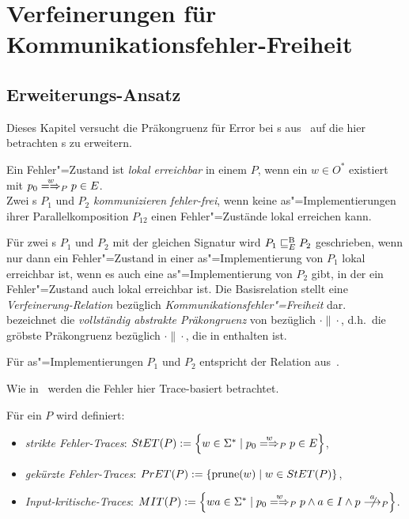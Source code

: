 \chapter{Verfeinerungen für Kommunikationsfehler-Freiheit}

\section{Erweiterungs-Ansatz}

Dieses Kapitel versucht die Präkongruenz für Error bei \EIO{}s
aus~\cite{Schinko2016BA} auf die hier betrachten \MEIO{}s zu erweitern.

\begin{Def}
  Ein Fehler"=Zustand ist \emph{lokal erreichbar} in einem \MEIO{} $P$, wenn
  ein $w\in O^*$ existiert mit $p_0 \weakmay[w]_{P} p\in E$.\\
  Zwei \MEIO{}s $P_1$ und $P_2$ \emph{kommunizieren fehler-frei}, wenn keine
  as"=Implementierungen ihrer Parallelkomposition $P_{12}$ einen
  Fehler"=Zustände lokal erreichen kann.
\end{Def}

\vspace{0.2cm}

\begin{Def}
  \label{EBRelDef}
  Für zwei \MEIO{}s $P_1$ und $P_2$ mit der gleichen Signatur wird $P_1 \sqsubseteq  _E^\mathrm{B}{}
  P_2$ geschrieben, wenn nur dann ein Fehler"=Zustand in einer
  as"=Implementierung von $P_1$ lokal erreichbar ist, wenn es auch eine
  as"=Implementierung von $P_2$ gibt, in der ein Fehler"=Zustand auch lokal
  erreichbar ist. Die Basisrelation stellt eine \emph{Verfeinerung-Relation}
  bezüglich \emph{Kommunikationsfehler"=Freiheit} dar.\\
  \ECRel{} bezeichnet die \emph{vollständig abstrakte Präkongruenz} von
  \EBRel{} bezüglich $\cdot\|\cdot$, d.h.\ die gröbste Präkongruenz bezüglich
  $\cdot\|\cdot$, die in \EBRel{} enthalten ist.
\end{Def}

Für as"=Implementierungen $P_1$ und $P_2$ entspricht \EBRel{} der Relation
\EBbaRel{} aus~\cite{Schinko2016BA}.

Wie in~\cite{Schinko2016BA} werden die Fehler hier Trace-basiert betrachtet.

\begin{Def}
  \label{KommTracesDef}
  Für ein \MEIO{} $P$ wird definiert:
  \begin{itemize}
    \item \emph{strikte Fehler-Traces}: $\StET (P) :=
      \left\{w\in\Sigma ^* \mid p_0 \weakmay[w]_P p \in E\right\}$,
    \item \emph{gekürzte Fehler-Traces}: $PrET (P) :=
      \left\{\mathrm{prune} (w) \mid w\in StET (P)\right\}$,
    \item \emph{Input-kritische-Traces}: $\MIT (P) := \left\{wa\in\Sigma ^*
      \mid p_0 \weakmay[w]_P p \land a\in I\land p\nmust[a]_P \right\}$.
  \end{itemize}
\end{Def}

